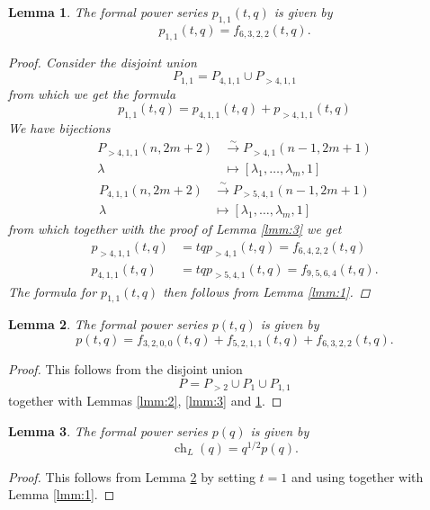 \documentclass[12pt,a4paper]{article}
\newtheorem{lemma}{Lemma}
\DeclareMathOperator{\ch}{ch}
\begin{document}
\begin{lemma}
  \label{lmm:4}
  The formal power series $p_{1,1}(t,q)$ is given by
  \begin{equation*}
    p_{1,1}(t,q)=f_{6,3,2,2}(t,q).
  \end{equation*}
  \begin{proof}
    Consider the disjoint union
    \begin{equation*}
      P_{1,1}=P_{4,1,1}\cup P_{>4,1,1}
    \end{equation*}
    from which we get the formula
    \begin{equation*}
      p_{1,1}(t,q)=p_{4,1,1}(t,q)+p_{>4,1,1}(t,q)
    \end{equation*}
    We have bijections
    \begin{align*}
      P_{>4,1,1}(n,2m+2)&\xrightarrow{\sim} P_{>4,1}(n-1,2m+1) \\
      \lambda&\mapsto [\lambda_1,\dots, \lambda_m,1]
    \end{align*}
    \begin{align*}
      P_{4,1,1}(n,2m+2)&\xrightarrow{\sim} P_{>5,4,1}(n-1,2m+1) \\
      \lambda&\mapsto [\lambda_1,\dots, \lambda_m,1]
    \end{align*}
    from which together with the proof of Lemma \ref{lmm:3} we get
    \begin{align*}
      p_{>4,1,1}(t,q)&=tqp_{>4,1}(t,q)=f_{6,4,2,2}(t,q) \\
      p_{4,1,1}(t,q)&=tqp_{>5,4,1}(t,q)=f_{9,5,6,4}(t,q).
    \end{align*}
    The formula for $p_{1,1}(t,q)$ then follows from Lemma \ref{lmm:1}.
  \end{proof}
\end{lemma}

\begin{lemma}
  \label{lmm:5}
  The formal power series $p(t,q)$ is given by
  \begin{equation*}
    p(t,q)=f_{3,2,0,0}(t,q)+f_{5,2,1,1}(t,q)+f_{6,3,2,2}(t,q).
  \end{equation*}
\end{lemma}
\begin{proof}
  This follows from the disjoint union
  \begin{equation*}
    P=P_{>2}\cup P_{1}\cup P_{1,1}
  \end{equation*}
  together with Lemmas \ref{lmm:2}, \ref{lmm:3} and \ref{lmm:4}.
\end{proof}
\begin{lemma}
  \label{lmm:6}
  The formal power series $p(q)$ is given by
  \begin{equation*}
    \ch_{L}(q)=q^{1/2}p(q).
  \end{equation*}
\end{lemma}
\begin{proof}
  This follows from Lemma \ref{lmm:5} by setting $t=1$ and using \cite[Theorem 4]{andrews_singular_2022} together with Lemma \ref{lmm:1}.
\end{proof}
\end{document}
